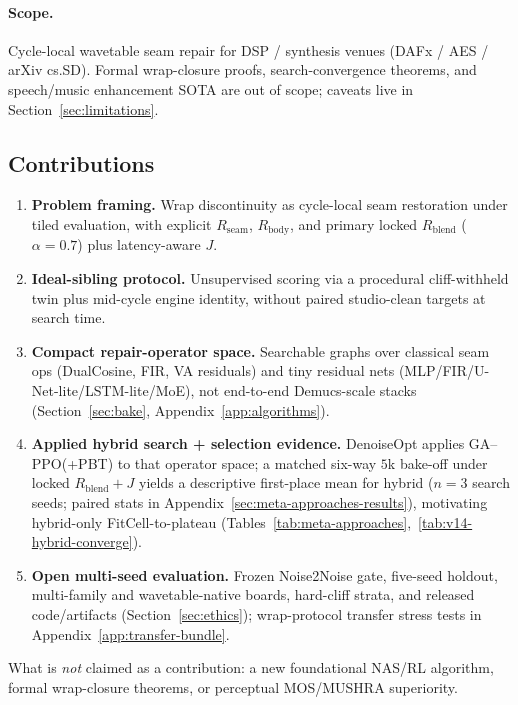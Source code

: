 \paragraph{Scope.}
Cycle-local wavetable seam repair for DSP / synthesis venues (DAFx / AES / arXiv cs.SD).
Formal wrap-closure proofs, search-convergence theorems, and speech/music enhancement SOTA are out of scope; caveats live in Section~\ref{sec:limitations}.

\subsection{Contributions}
\label{sec:contributions}
\begin{enumerate}
  \item \textbf{Problem framing.} Wrap discontinuity as cycle-local seam restoration under tiled evaluation, with explicit $R_{\mathrm{seam}}$, $R_{\mathrm{body}}$, and primary locked $R_{\mathrm{blend}}$ ($\alpha{=}0.7$) plus latency-aware $J$.
  \item \textbf{Ideal-sibling protocol.} Unsupervised scoring via a procedural cliff-withheld twin plus mid-cycle engine identity, without paired studio-clean targets at search time.
  \item \textbf{Compact repair-operator space.} Searchable graphs over classical seam ops (DualCosine, FIR, VA residuals) and tiny residual nets (MLP/FIR/U-Net-lite/LSTM-lite/MoE), not end-to-end Demucs-scale stacks (Section~\ref{sec:bake}, Appendix~\ref{app:algorithms}).
  \item \textbf{Applied hybrid search + selection evidence.} DenoiseOpt applies GA--PPO(+PBT) to that operator space; a matched six-way $5$k bake-off under locked $R_{\mathrm{blend}}{+}J$ yields a descriptive first-place mean for hybrid ($n{=}3$ search seeds; paired stats in Appendix~\ref{sec:meta-approaches-results}), motivating hybrid-only FitCell-to-plateau (Tables~\ref{tab:meta-approaches},~\ref{tab:v14-hybrid-converge}).
  \item \textbf{Open multi-seed evaluation.} Frozen Noise2Noise gate, five-seed holdout, multi-family and wavetable-native boards, hard-cliff strata, and released code/artifacts (Section~\ref{sec:ethics}); wrap-protocol transfer stress tests in Appendix~\ref{app:transfer-bundle}.
\end{enumerate}
What is \emph{not} claimed as a contribution: a new foundational NAS/RL algorithm, formal wrap-closure theorems, or perceptual MOS/MUSHRA superiority.
